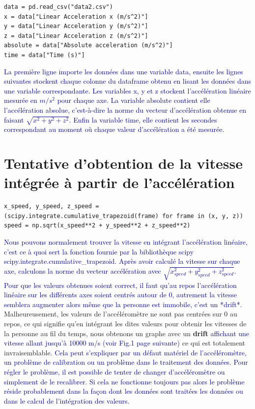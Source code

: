 \documentclass[11pt]{article}
\begin{document}
\begin{verbatim}
data = pd.read_csv("data2.csv")
x = data["Linear Acceleration x (m/s^2)"]
y = data["Linear Acceleration y (m/s^2)"]
z = data["Linear Acceleration z (m/s^2)"]
absolute = data["Absolute acceleration (m/s^2)"]
time = data["Time (s)"]
\end{verbatim}

\textcolor{darkblue}{La première ligne importe les données dans une variable data, ensuite les lignes suivantes stockent chaque colonne du dataframe obtenu en lisant les données dans une variable correspondante. Les variables x, y et z stockent l'accélération linéaire mesurée en $m/s^2$ pour chaque axe. La variable absolute contient elle l'accélération absolue, c'est-à-dire la norme du vecteur d'accélération obtenue en faisant $\sqrt{x^2+y^2+z^2}$. Enfin la variable time, elle contient les secondes correspondant au moment où chaque valeur d'accélération a été mesurée.}
\section{Tentative d'obtention de la vitesse intégrée à partir de l'accélération}
\label{sec:org3de4f9d}

\begin{verbatim}
x_speed, y_speed, z_speed = (scipy.integrate.cumulative_trapezoid(frame) for frame in (x, y, z))
speed = np.sqrt(x_speed**2 + y_speed**2 + z_speed**2)
\end{verbatim}

\textcolor{darkblue}{Nous pouvons normalement trouver la vitesse en intégrant l'accélération linéaire, c'est ce à quoi sert la fonction fournie par la bibliothèque scipy scipy.integrate.cumulative\_trapezoid. Après avoir calculé la vitesse sur chaque axe, calculons la norme du vecteur accélération avec $\sqrt{x_{speed}^2+y_{speed}^2+z_{speed}^2}$. Pour que les valeurs obtenues soient correct, il faut qu'au repos l'accélération linéaire sur les différents axes soient centrés autour de 0, autrement la vitesse semblera augmenter alors même que la personne est immobile, c'est un *drift*.}
Malheureusement, les valeurs de l'accéléromètre ne sont pas centrées sur 0 au repos, ce qui signifie qu'en intégrant les dites valeurs pour obtenir
les vitesses de la personne au fil du temps, nous obtenons un graphe avec un \textbf{drift} \textcolor{darkblue}{affichant une vitesse allant jusqu'à 10000 m/s (voir Fig.1 page suivante)} ce qui est totalement invraisemblable. \textcolor{darkblue}{Cela peut s'expliquer par un défaut matériel de l'accéléromètre, un problème de calibration ou un problème dans le traitement des données. Pour régler le problème, il est possible de tenter de changer d'accéléromètre ou simplement de le recalibrer. Si cela ne fonctionne toujours pas alors le problème réside probablement dans la façon dont les données sont traitées les données ou dans le calcul de l'intégration des valeurs.}
\end{document}
